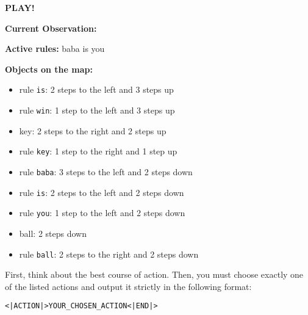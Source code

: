 \begin{GreenBox}[frametitle={\textbf{Iteration 1 Baba-is-ai Prompt}}]
\textbf{PLAY!}

\textbf{Current Observation:}

\textbf{Active rules:}  
baba is you  

\textbf{Objects on the map:}
\begin{itemize}
    \item rule \texttt{is}: 2 steps to the left and 3 steps up
    \item rule \texttt{win}: 1 step to the left and 3 steps up
    \item key: 2 steps to the right and 2 steps up
    \item rule \texttt{key}: 1 step to the right and 1 step up
    \item rule \texttt{baba}: 3 steps to the left and 2 steps down
    \item rule \texttt{is}: 2 steps to the left and 2 steps down
    \item rule \texttt{you}: 1 step to the left and 2 steps down
    \item ball: 2 steps down
    \item rule \texttt{ball}: 2 steps to the right and 2 steps down
\end{itemize}

First, think about the best course of action.  
Then, you must choose exactly one of the listed actions and output it strictly in the following format:

\texttt{<|ACTION|>YOUR\_CHOSEN\_ACTION<|END|>}
\end{GreenBox}
\newpage

